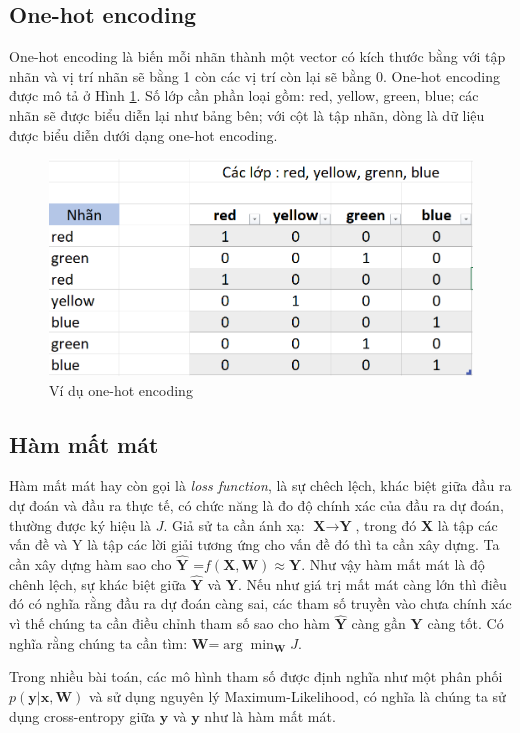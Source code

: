\subsection{One-hot encoding}
One-hot encoding là biến mỗi nhãn thành một vector có kích thước bằng với tập nhãn và vị trí nhãn sẽ bằng 1 còn các vị trí còn lại sẽ bằng 0. One-hot encoding được mô tả ở Hình \ref{fig:onehot}. Số lớp cần phần loại gồm: red, yellow, green, blue; các nhãn sẽ được biểu diễn lại như bảng bên; với cột là tập nhãn, dòng là dữ liệu được biểu diễn dưới dạng one-hot encoding.
\begin{figure}[H]
\begin{center}
\includegraphics[scale=0.75]{chap3/image/onehot.png}

\caption{ Ví dụ one-hot encoding}
\label{fig:onehot}
\end{center}
\end{figure}
\subsection{Hàm mất mát}
Hàm mất mát hay còn gọi là \textit{loss function}, là sự chêch lệch, khác biệt giữa đầu ra dự đoán và đầu ra thực tế, có chức năng là đo độ chính xác của đầu ra dự đoán, thường được ký hiệu là $J$. Giả sử ta cần ánh xạ: $\textbf{X}\to \textbf{Y}$,  trong đó \textbf{X} là tập các vấn đề và Y là tập các lời giải tương ứng cho vấn đề đó thì ta cần xây dựng. Ta cần xây dựng hàm sao cho $\widehat{\textbf{Y}}$ =$ f(\textbf{X},\textbf{W}) \approx \textbf{Y}$. Như vậy hàm mất mát là độ chênh lệch, sự khác biệt giữa \textbf{$\widehat{\textbf{Y}}$} và $\textbf{Y}$. Nếu như giá trị mất mát càng lớn thì điều đó có nghĩa rằng đầu ra dự đoán càng sai, các tham số truyền vào chưa chính xác vì thế chúng ta cần điều chỉnh tham số sao cho hàm \textbf{$\widehat{\textbf{Y}}$} càng gần $\textbf{Y}$ càng tốt. Có nghĩa rằng chúng ta cần tìm: $\textbf{W}$=$\arg\min_{\textbf{W}} J$.\par
Trong nhiều bài toán, các mô hình tham số được định nghĩa như một phân phối $p(\textbf{y}|\textbf{x},\textbf{W})$ và sử dụng nguyên lý Maximum-Likelihood, có nghĩa là chúng ta sử dụng cross-entropy giữa $\widehat{\textbf{y}}$ và $\textbf{y}$ như là hàm mất mát. 

